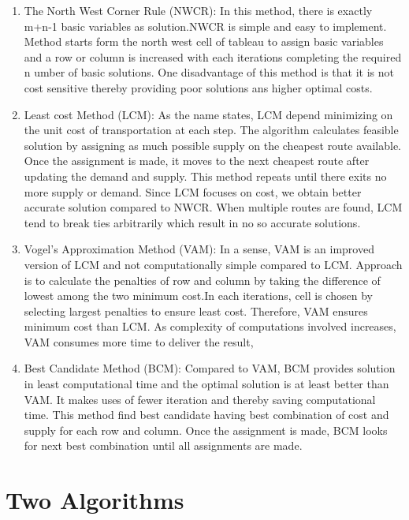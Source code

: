 \documentclass[12pt]{article}
\theoremstyle{definition}
\theoremstyle{definition}
\numberwithin{equation}{section}
\begin{document}
\begin{enumerate}
  
  \item The North West Corner Rule (NWCR): In this method, there is exactly m+n-1 basic variables as solution.NWCR is simple and easy to implement. Method starts form the north west cell of tableau to assign basic variables and a row or column is increased with each iterations completing the required n umber of basic solutions. One disadvantage of this method is that it is not cost sensitive thereby providing poor solutions ans higher optimal costs\cite{a3}.
  
  \item Least cost Method (LCM): As the name states, LCM depend minimizing on the unit cost of transportation at each step. The algorithm calculates feasible solution by assigning as much possible supply on the cheapest route available. Once the assignment is made, it moves to the next cheapest route after updating the demand and supply. This method repeats until there exits no more supply or demand. Since LCM focuses on cost, we obtain better accurate solution compared to NWCR\cite{a4}. When multiple routes are found, LCM tend to break ties arbitrarily which result in no so accurate solutions\cite{a5}.
  
  \item Vogel's Approximation Method (VAM): In a sense, VAM is an improved version of LCM and not computationally simple compared to LCM. Approach is to calculate the penalties of row and column by taking the difference of lowest among the two minimum cost.In each iterations, cell is chosen by selecting largest penalties to ensure least cost. Therefore, VAM ensures minimum cost than LCM\cite{a6}. As complexity of computations involved increases, VAM consumes more time to deliver the result, 

\item Best Candidate Method (BCM): Compared to VAM, BCM provides solution in least computational time and the optimal solution is at least better than VAM. It makes uses of fewer iteration and thereby saving computational time.  This method find best candidate having best combination of cost and supply for each row and column. Once the assignment is made, BCM looks for next best combination until all assignments are made\cite{a2}.

\end{enumerate}

\section{Two Algorithms}
\end{document}
